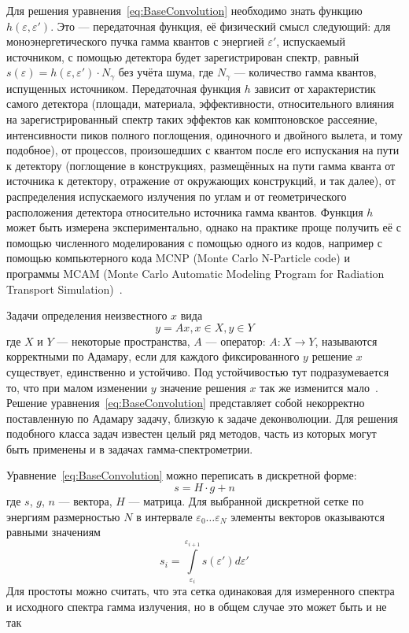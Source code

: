 Для решения уравнения~\ref{eq:BaseConvolution} необходимо знать функцию $ h( \varepsilon, \varepsilon' ) $. Это --- передаточная функция, её физический смысл следующий: для моноэнергетического пучка гамма квантов с энергией $\varepsilon'$, испускаемый источником, с помощью детектора будет зарегистрирован спектр, равный $s(\varepsilon) = h(\varepsilon, \varepsilon') \cdot N_{\gamma}$ без учёта шума, где $N_{\gamma}$ --- количество гамма квантов, испущенных источником. Передаточная функция $h$ зависит от характеристик самого детектора (площади, материала, эффективности, относительного влияния на зарегистрированный спектр таких эффектов как комптоновское рассеяние, интенсивности пиков полного поглощения, одиночного и двойного вылета, и тому подобное), от процессов, произошедших с квантом после его испускания на пути к детектору (поглощение в конструкциях, размещённых на пути гамма кванта от источника к детектору, отражение от окружающих конструкций, и так далее), от распределения испускаемого излучения по углам и от геометрического расположения детектора относительно источника гамма квантов. Функция $h$ может быть измерена экспериментально, однако на практике проще получить её с помощью численного моделирования с помощью одного из кодов, например с помощью компьютерного кода MCNP (Monte Carlo N-Particle code) и программы MCAM (Monte Carlo Automatic Modeling Program for Radiation Transport Simulation)~\cite{Hendricks2004,Fischer2005,Wu2009}.

Задачи определения неизвестного $x$ вида 
\begin{equation*}
  y = A x, x \in X, y \in Y
\end{equation*}
где $X$ и $Y$ --- некоторые пространства, $A$ --- оператор: $ A : X \rightarrow Y $, называются корректными по Адамару, если для каждого фиксированного $y$ решение $x$ существует, единственно и устойчиво. Под устойчивостью тут подразумевается то, что при малом изменении $y$ значение решения $x$ так же изменится мало~\cite{Liskovets1982}. Решение уравнения~\ref{eq:BaseConvolution} представляет собой некорректно поставленную по Адамару задачу, близкую к задаче деконволюции. Для решения подобного класса задач известен целый ряд методов, часть из которых могут быть применены и в задачах гамма-спектрометрии.

Уравнение~\ref{eq:BaseConvolution} можно переписать в дискретной форме:
\begin{equation}
  \label{eq:BaseConvolutionMatrix}
  s = H \cdot g + n 
\end{equation}
где $s$, $g$, $n$ --- вектора, $H$ --- матрица. Для выбранной дискретной сетке по энергиям размерностью $N$ в интервале $ \varepsilon_0 \ldots \varepsilon_N $ элементы векторов оказываются равными значениям
\begin{equation*}
  s_i = \int \limits_{\varepsilon_i}^{\varepsilon_{i+1}} s( \varepsilon' ) d \varepsilon'
\end{equation*}
Для простоты можно считать, что эта сетка одинаковая для измеренного спектра и исходного спектра гамма излучения, но в общем случае это может быть и не так

